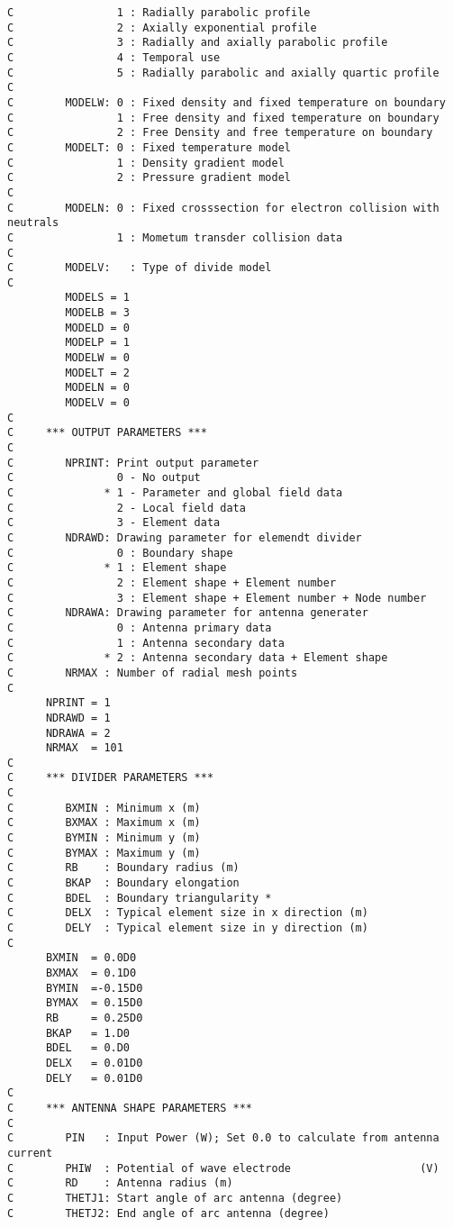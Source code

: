{\begin{verbatim}
C                1 : Radially parabolic profile
C                2 : Axially exponential profile
C                3 : Radially and axially parabolic profile
C                4 : Temporal use
C                5 : Radially parabolic and axially quartic profile
C
C        MODELW: 0 : Fixed density and fixed temperature on boundary
C                1 : Free density and fixed temperature on boundary
C                2 : Free Density and free temperature on boundary
C        MODELT: 0 : Fixed temperature model
C                1 : Density gradient model
C                2 : Pressure gradient model
C
C        MODELN: 0 : Fixed crosssection for electron collision with neutrals
C                1 : Mometum transder collision data
C
C        MODELV:   : Type of divide model
C
         MODELS = 1
         MODELB = 3
         MODELD = 0
         MODELP = 1
         MODELW = 0
         MODELT = 2
         MODELN = 0
         MODELV = 0
C
C     *** OUTPUT PARAMETERS ***
C
C        NPRINT: Print output parameter
C                0 - No output
C              * 1 - Parameter and global field data
C                2 - Local field data
C                3 - Element data
C        NDRAWD: Drawing parameter for elemendt divider
C                0 : Boundary shape
C              * 1 : Element shape
C                2 : Element shape + Element number
C                3 : Element shape + Element number + Node number
C        NDRAWA: Drawing parameter for antenna generater
C                0 : Antenna primary data
C                1 : Antenna secondary data
C              * 2 : Antenna secondary data + Element shape
C        NRMAX : Number of radial mesh points
C
      NPRINT = 1
      NDRAWD = 1
      NDRAWA = 2
      NRMAX  = 101
C
C     *** DIVIDER PARAMETERS ***
C
C        BXMIN : Minimum x (m)
C        BXMAX : Maximum x (m)
C        BYMIN : Minimum y (m)
C        BYMAX : Maximum y (m)
C        RB    : Boundary radius (m)
C        BKAP  : Boundary elongation
C        BDEL  : Boundary triangularity *
C        DELX  : Typical element size in x direction (m)
C        DELY  : Typical element size in y direction (m)
C
      BXMIN  = 0.0D0
      BXMAX  = 0.1D0
      BYMIN  =-0.15D0
      BYMAX  = 0.15D0
      RB     = 0.25D0
      BKAP   = 1.D0
      BDEL   = 0.D0
      DELX   = 0.01D0
      DELY   = 0.01D0
C
C     *** ANTENNA SHAPE PARAMETERS ***
C
C        PIN   : Input Power (W); Set 0.0 to calculate from antenna current
C        PHIW  : Potential of wave electrode                    (V)
C        RD    : Antenna radius (m)
C        THETJ1: Start angle of arc antenna (degree)
C        THETJ2: End angle of arc antenna (degree)

\end{verbatim}}
